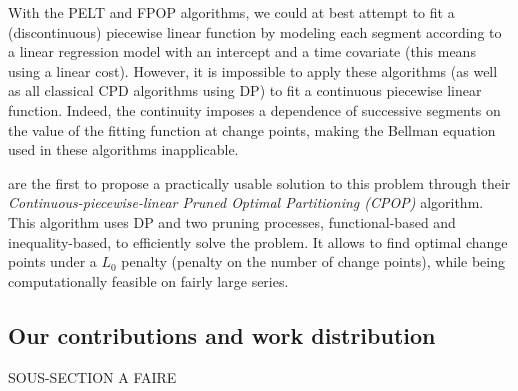\documentclass[11pt]{article}
\begin{document}
With the PELT and FPOP algorithms, we could at best attempt to fit a (discontinuous) piecewise linear function by modeling each segment according to a linear regression model with an intercept and a time covariate (this means using a linear cost). However, it is impossible to apply these algorithms (as well as all classical CPD algorithms using DP) to fit a continuous piecewise linear function. Indeed, the continuity imposes a dependence of successive segments on the value of the fitting function at change points, making the Bellman equation used in these algorithms inapplicable. 

\textcite{maidstone2019} are the first to propose a practically usable solution to this problem through their \textit{Continuous-piecewise-linear Pruned Optimal Partitioning (CPOP)} algorithm. This algorithm uses DP and two pruning processes, functional-based and inequality-based, to efficiently solve the problem. It allows to find optimal change points under a $L_0$ penalty (penalty on the number of change points), while being computationally feasible on fairly large series.


\subsection{Our contributions and work distribution}

SOUS-SECTION A FAIRE 
\end{document}
